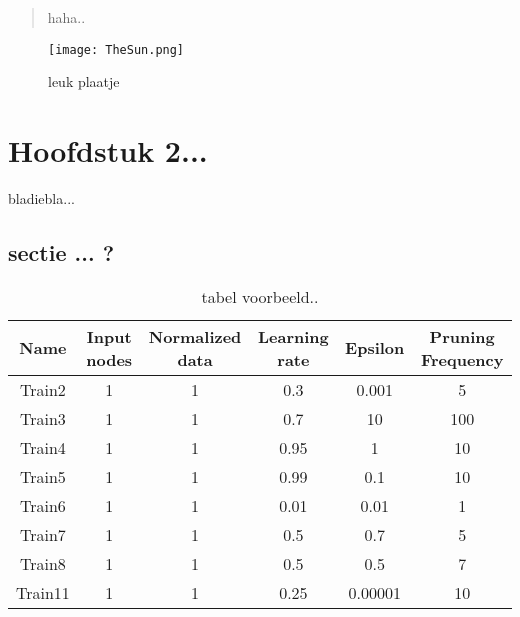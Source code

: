 \documentclass[11pt,fleqn]{book} %
\begin{document}
\begin{quote}
haha..
\end{quote}

\begin{figure}[h]
    \centering
    \texttt{[image: TheSun.png]}
    \caption{leuk plaatje}
    \label{fig:pca}
\end{figure}




\chapter{Hoofdstuk 2...}

bladiebla...

\section{sectie ... ?}


\begin{table}[h!]
  \centering
    \begin{tabular}{ c c c c c c }
    \hline\hline
    
    Name & Input nodes & Normalized data & Learning rate & Epsilon & Pruning Frequency\\
    \hline
    
    Train2 & 1 & 1 & 0.3 & 0.001 & 5\\
    Train3 & 1 & 1 & 0.7 & 10 & 100\\
    Train4 & 1 & 1 & 0.95 & 1 & 10\\
    Train5 & 1 & 1 & 0.99 & 0.1 & 10\\
    Train6 & 1 & 1 & 0.01 & 0.01 & 1\\
    Train7 & 1 & 1 & 0.5 & 0.7 & 5\\
    Train8 & 1 & 1 & 0.5 & 0.5 & 7\\
    Train11 & 1 & 1 & 0.25 & 0.00001 & 10\\
    
    \hline
  \end{tabular}
  \caption{tabel voorbeeld..}
  \label{tab:ds9failed}
\end{table}

\cite{book_key}

  
\end{document}

